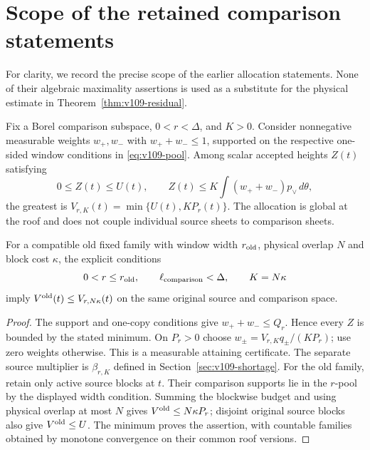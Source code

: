 \section{Scope of the retained comparison statements}
\label{sec:v109-scope}
For clarity, we record the precise scope of the earlier allocation
statements. None of their algebraic maximality assertions is used
as a substitute for the physical estimate in
Theorem~\ref{thm:v109-residual}.

\begin{proposition}
\label{prop:v109-maximal}
Fix a Borel comparison subspace, $0<r<\Delta$, and $K>0$.
Consider nonnegative measurable weights $w_+,w_-$ with
$w_++w_-\leq1$, supported on the respective one-sided window
conditions in \eqref{eq:v109-pool}. Among scalar accepted heights
$Z(t)$ satisfying
\[
 0\leq Z(t)\leq U(t),\qquad
 Z(t)\leq K\int(w_++w_-)p_\vee\,d\theta,
\]
the greatest is $V_{r,K}(t)=\min\{U(t),KP_r(t)\}$.
The allocation is global at the roof and does not couple individual
source sheets to comparison sheets.

For a compatible old fixed family with window width $r_{\rm old}$,
physical overlap $N$ and block cost $\kappa$, the explicit conditions
\[
 0<r\leq r_{\rm old},\qquad \ell_{\rm comparison}<\Delta,
 \qquad K=N\kappa
\]
imply $V^{\rm old}(t)\leq V_{r,N\kappa}(t)$ on the same original
source and comparison space.
\end{proposition}
\begin{proof}
The support and one-copy conditions give $w_++w_-\leq Q_r$.
Hence every $Z$ is bounded by the stated minimum. On $P_r>0$ choose
$w_\pm=V_{r,K}q_\pm/(KP_r)$; use zero weights otherwise.
This is a measurable attaining certificate. The separate source
multiplier is $\beta_{r,K}$ defined in
Section~\ref{sec:v109-shortage}.
For the old family, retain only active source blocks at $t$.
Their comparison supports lie in the $r$-pool by the displayed
width condition. Summing the blockwise budget and using physical
overlap at most $N$ gives $V^{\rm old}\leq N\kappa P_r$;
disjoint original source blocks also give $V^{\rm old}\leq U$.
The minimum proves the assertion, with countable families obtained
by monotone convergence on their common roof versions.
\end{proof}

